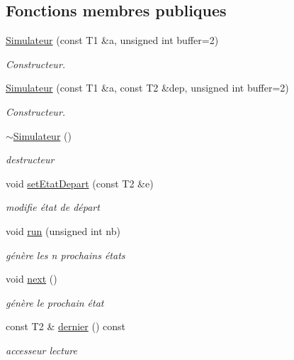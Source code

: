 \subsection*{Fonctions membres publiques}
\begin{DoxyCompactItemize}
\item 
\hyperlink{class_simulateur_afbd90fb92cd6e29e7a2ffe222d0194f8}{Simulateur} (const T1 \&a, unsigned int buffer=2)
\begin{DoxyCompactList}\small\item\em Constructeur. \end{DoxyCompactList}\item 
\hyperlink{class_simulateur_a9c6136e1ffa9ff733ab6b6680a556535}{Simulateur} (const T1 \&a, const T2 \&dep, unsigned int buffer=2)
\begin{DoxyCompactList}\small\item\em Constructeur. \end{DoxyCompactList}\item 
\hyperlink{class_simulateur_a9253bdd8f60dd5f2f2af9ab1e855304c}{$\sim$\+Simulateur} ()
\begin{DoxyCompactList}\small\item\em destructeur \end{DoxyCompactList}\item 
void \hyperlink{class_simulateur_a31296b4599796563a8a6ad1177b76ef4}{set\+Etat\+Depart} (const T2 \&e)
\begin{DoxyCompactList}\small\item\em modifie état de départ \end{DoxyCompactList}\item 
void \hyperlink{class_simulateur_a5a9d0c9de702ee1d71c02126a5a80fad}{run} (unsigned int nb)
\begin{DoxyCompactList}\small\item\em génère les n prochains états \end{DoxyCompactList}\item 
void \hyperlink{class_simulateur_a6043e64df6e41c1d4ae84da540786379}{next} ()
\begin{DoxyCompactList}\small\item\em génère le prochain état \end{DoxyCompactList}\item 
const T2 \& \hyperlink{class_simulateur_a90dded0212c5d4f7005b90290f30c81a}{dernier} () const 
\begin{DoxyCompactList}\small\item\em accesseur lecture \end{DoxyCompactList}\item 

\end{DoxyCompactItemize}
